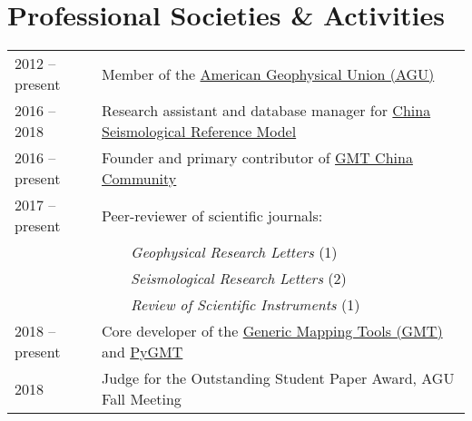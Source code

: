 \section*{Professional Societies \& Activities}

\newcommand{\tabitem}{~~\llap{\textbullet}~~}

\begin{tabular}{ll}
2012 -- present & Member of the \href{https://sites.agu.org/}{American Geophysical Union (AGU)} \\
2016 -- 2018    & Research assistant and database manager for \href{http://chinageorefmodel.org/}{China Seismological Reference Model} \\
2016 -- present & Founder and primary contributor of \href{http://gmt-china.org/}{GMT China Community} \\
2017 -- present & Peer-reviewer of scientific journals: \\
                & \tabitem \textit{Geophysical Research Letters} (1) \\
                & \tabitem \textit{Seismological Research Letters} (2) \\
                & \tabitem \textit{Review of Scientific Instruments} (1) \\
2018 -- present & Core developer of the \href{https://github.com/GenericMappingTools/gmt}{Generic Mapping Tools (GMT)} and \href{https://github.com/GenericMappingTools/pygmt}{PyGMT} \\
2018 & Judge for the Outstanding Student Paper Award, AGU Fall Meeting
\end{tabular}
